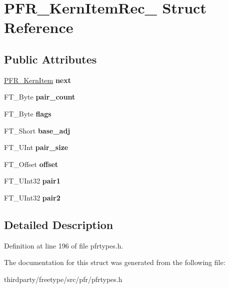 \hypertarget{struct_p_f_r___kern_item_rec__}{}\section{P\+F\+R\+\_\+\+Kern\+Item\+Rec\+\_\+ Struct Reference}
\label{struct_p_f_r___kern_item_rec__}
\subsection*{Public Attributes}
\begin{DoxyCompactItemize}
\item 
\mbox{\label{struct_p_f_r___kern_item_rec___a80d404b6fb0874f082aa57b812e3d414}} 
\hyperlink{struct_p_f_r___kern_item_rec__}{P\+F\+R\+\_\+\+Kern\+Item} {\bfseries next}
\item 
\mbox{\label{struct_p_f_r___kern_item_rec___aa9d0c68d54511d90763fa36c54eac06b}} 
F\+T\+\_\+\+Byte {\bfseries pair\+\_\+count}
\item 
\mbox{\label{struct_p_f_r___kern_item_rec___a0571e32cab1b99bce9e529f73142ffb5}} 
F\+T\+\_\+\+Byte {\bfseries flags}
\item 
\mbox{\label{struct_p_f_r___kern_item_rec___a3cfa001fc470ffd8327f454c31849841}} 
F\+T\+\_\+\+Short {\bfseries base\+\_\+adj}
\item 
\mbox{\label{struct_p_f_r___kern_item_rec___a8688f4496dd077ec4c077476edd24abd}} 
F\+T\+\_\+\+U\+Int {\bfseries pair\+\_\+size}
\item 
\mbox{\label{struct_p_f_r___kern_item_rec___af2190968fb2748b39796b736bfe05c1c}} 
F\+T\+\_\+\+Offset {\bfseries offset}
\item 
\mbox{\label{struct_p_f_r___kern_item_rec___a2b749f696dfa81099398ce5416038c50}} 
F\+T\+\_\+\+U\+Int32 {\bfseries pair1}
\item 
\mbox{\label{struct_p_f_r___kern_item_rec___a1cb3e739d54db8fb3fad46bcee8d2f19}} 
F\+T\+\_\+\+U\+Int32 {\bfseries pair2}
\end{DoxyCompactItemize}


\subsection{Detailed Description}


Definition at line 196 of file pfrtypes.\+h.



The documentation for this struct was generated from the following file\+:\begin{DoxyCompactItemize}
\item 
thirdparty/freetype/src/pfr/pfrtypes.\+h\end{DoxyCompactItemize}

